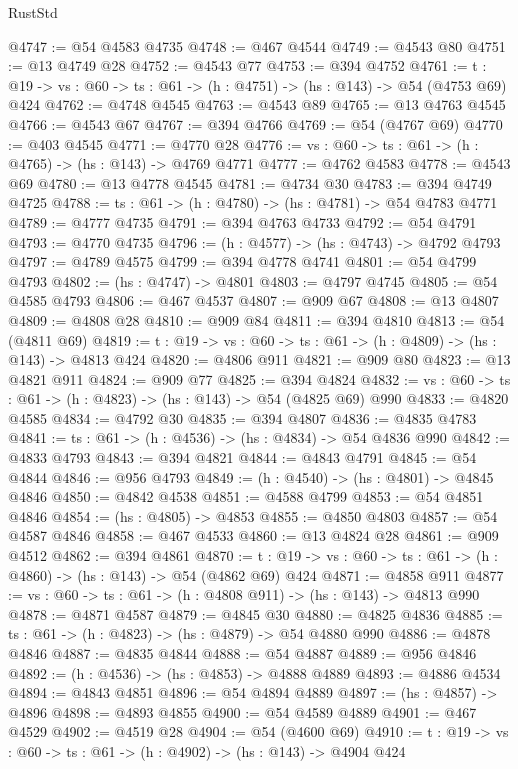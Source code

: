 \begin{lexlean}{RustStd}
\begin{coremodule}
{\begin{coremodule}
{{{{{{{{@4747 := @54 @4583 @4735
@4748 := @467 @4544
@4749 := @4543 @80
@4751 := @13 @4749 @28
@4752 := @4543 @77
@4753 := @394 @4752
@4761 := {t : @19} -> {vs : @60} -> {ts : @61} -> (h : @4751) -> (hs : @143) -> @54 (@4753 @69) @424
@4762 := @4748 @4545
@4763 := @4543 @89
@4765 := @13 @4763 @4545
@4766 := @4543 @67
@4767 := @394 @4766
@4769 := @54 (@4767 @69)
@4770 := @403 @4545
@4771 := @4770 @28
@4776 := {vs : @60} -> {ts : @61} -> (h : @4765) -> (hs : @143) -> @4769 @4771
@4777 := @4762 @4583
@4778 := @4543 @69
@4780 := @13 @4778 @4545
@4781 := @4734 @30
@4783 := @394 @4749 @4725
@4788 := {ts : @61} -> (h : @4780) -> (hs : @4781) -> @54 @4783 @4771
@4789 := @4777 @4735
@4791 := @394 @4763 @4733
@4792 := @54 @4791
@4793 := @4770 @4735
@4796 := (h : @4577) -> (hs : @4743) -> @4792 @4793
@4797 := @4789 @4575
@4799 := @394 @4778 @4741
@4801 := @54 @4799 @4793
@4802 := (hs : @4747) -> @4801
@4803 := @4797 @4745
@4805 := @54 @4585 @4793
@4806 := @467 @4537
@4807 := @909 @67
@4808 := @13 @4807
@4809 := @4808 @28
@4810 := @909 @84
@4811 := @394 @4810
@4813 := @54 (@4811 @69)
@4819 := {t : @19} -> {vs : @60} -> {ts : @61} -> (h : @4809) -> (hs : @143) -> @4813 @424
@4820 := @4806 @911
@4821 := @909 @80
@4823 := @13 @4821 @911
@4824 := @909 @77
@4825 := @394 @4824
@4832 := {vs : @60} -> {ts : @61} -> (h : @4823) -> (hs : @143) -> @54 (@4825 @69) @990
@4833 := @4820 @4585
@4834 := @4792 @30
@4835 := @394 @4807
@4836 := @4835 @4783
@4841 := {ts : @61} -> (h : @4536) -> (hs : @4834) -> @54 @4836 @990
@4842 := @4833 @4793
@4843 := @394 @4821
@4844 := @4843 @4791
@4845 := @54 @4844
@4846 := @956 @4793
@4849 := (h : @4540) -> (hs : @4801) -> @4845 @4846
@4850 := @4842 @4538
@4851 := @4588 @4799
@4853 := @54 @4851 @4846
@4854 := (hs : @4805) -> @4853
@4855 := @4850 @4803
@4857 := @54 @4587 @4846
@4858 := @467 @4533
@4860 := @13 @4824 @28
@4861 := @909 @4512
@4862 := @394 @4861
@4870 := {t : @19} -> {vs : @60} -> {ts : @61} -> (h : @4860) -> (hs : @143) -> @54 (@4862 @69) @424
@4871 := @4858 @911
@4877 := {vs : @60} -> {ts : @61} -> (h : @4808 @911) -> (hs : @143) -> @4813 @990
@4878 := @4871 @4587
@4879 := @4845 @30
@4880 := @4825 @4836
@4885 := {ts : @61} -> (h : @4823) -> (hs : @4879) -> @54 @4880 @990
@4886 := @4878 @4846
@4887 := @4835 @4844
@4888 := @54 @4887
@4889 := @956 @4846
@4892 := (h : @4536) -> (hs : @4853) -> @4888 @4889
@4893 := @4886 @4534
@4894 := @4843 @4851
@4896 := @54 @4894 @4889
@4897 := (hs : @4857) -> @4896
@4898 := @4893 @4855
@4900 := @54 @4589 @4889
@4901 := @467 @4529
@4902 := @4519 @28
@4904 := @54 (@4600 @69)
@4910 := {t : @19} -> {vs : @60} -> {ts : @61} -> (h : @4902) -> (hs : @143) -> @4904 @424
}}}}}}}}
\end{coremodule}}
\end{coremodule}
\end{lexlean}
